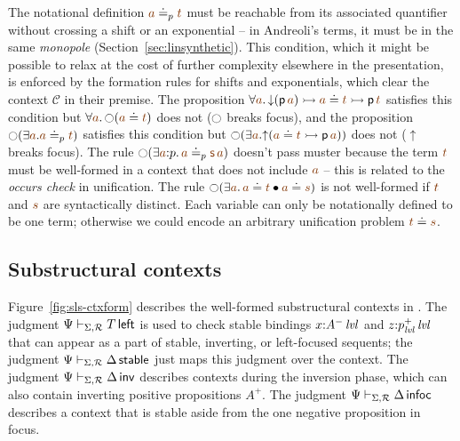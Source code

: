 The notational definition $\lf{a} \doteq_p \lf{t}$ 
must be reachable from its
associated quantifier without crossing a shift or an exponential -- in
Andreoli's terms, it must be in the same {\it monopole}
(Section~\ref{sec:linsynthetic}).  This condition,
which it might be possible to relax at the cost of further
complexity elsewhere in the presentation, is enforced by the formation
rules for shifts and exponentials, which clear the context $\mathcal C$
in their premise. 
%
The proposition $\forall \lf{a}.\, {\downarrow}({\sf p}\,\lf{a})
\lefti \lf{a} \doteq \lf{t} \lefti {\sf p}\,\lf{t}$ satisfies this
condition but $\forall \lf{a}.\,{\ocircle}(\lf{a} \doteq \lf{t})$ does
not ($\ocircle$ breaks focus), and the proposition ${\ocircle}(\exists
\lf{a}. \lf{a} \doteq_p \lf{t})$ satisfies this condition but
${\ocircle}(\exists \lf{a}.  {\uparrow}(\lf{a} \doteq \lf{t} \lefti
{\sf p}\,\lf{a}))$ does not (${\uparrow}$ breaks focus). The rule
${\ocircle}(\exists \lf{a}{:}p.\,\lf{a} \doteq_p \lf{{\sf s}\,a})$
doesn't pass muster because the term $\lf{t}$ must be well-formed in a
context that does not include $\lf{a}$ -- this is related to the {\it
  occurs check} in unification.
%
The rule ${\ocircle}(\exists \lf{a}.\,
\lf{a} \doteq \lf{t} \fuse \lf{a} \doteq \lf{s})$ is not well-formed 
if $\lf{t}$ and $\lf{s}$ are syntactically distinct.
Each variable can only be notationally defined to be one 
term; otherwise we could encode an arbitrary
unification problem $\lf{t} \doteq \lf{s}$.




\subsection{Substructural contexts}



Figure~\ref{fig:sls-ctxform} describes the well-formed substructural
contexts in \sls. The judgment $\Psi \vdash_{\Sigma,\mathcal R} T\,{\sf
  left}$ is used to check stable bindings $x{:}{A^-}\,{{\it lvl}}$ and
$z{:}{p^+_{\it lvl}}\,{{\it lvl}}$ that can appear as a part of stable,
inverting, or left-focused sequents; the judgment $\Psi
\vdash_{\Sigma,\mathcal R} \Delta\,{\sf stable}$ just maps this judgment
over the context. The judgment $\Psi \vdash_{\Sigma,\mathcal R}
\Delta\,{\sf inv}$ describes contexts during the inversion phase,
which can also contain inverting positive propositions $A^+$. The
judgment $\Psi \vdash_{\Sigma,\mathcal R} \Delta\,{\sf infoc}$ describes
a context that is stable aside from the one negative proposition in
focus. 

